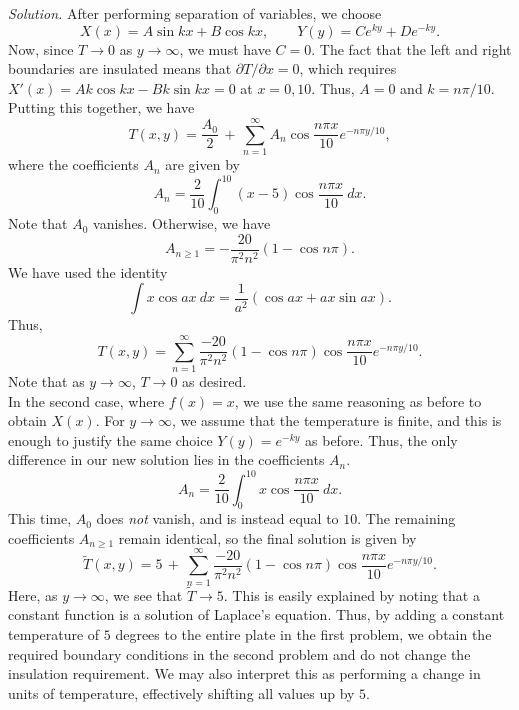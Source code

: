 \documentclass[10pt]{article}
\begin{document}
        \textit{Solution.} After performing separation of variables, we choose
        \[
                X(x) = A\sin{k x} + B\cos{k x}, \quad\quad Y(y) = Ce^{k y} + De^{-k y}.
        \]
        Now, since $T \to 0$ as $y \to \infty$, we must have $C = 0$. The fact that the left and right boundaries are insulated means that
        $\partial T /\partial x = 0$, which requires $X'(x) = Ak\cos{kx} - Bk\sin{kx} = 0$ at $x = 0, 10$. Thus, $A = 0$ and $k = n \pi /10$.
        Putting this together, we have
        \[
                T(x, y) = \frac{A_0}{2} \,+\, \sum_{n = 1}^\infty A_n \cos\frac{n \pi x}{10}e^{-n\pi y /10},
        \]
        where the coefficients $A_n$ are given by
        \[
                A_n = \frac{2}{10} \int_0^{10} (x - 5) \cos\frac{n\pi x}{10}\: dx.
        \]
        Note that $A_0$ vanishes. Otherwise, we have
        \[
                A_{n \geq 1} = -\frac{20}{\pi^2 n^2}(1 - \cos{n\pi}).
        \]
        We have used the identity
        \[
                \int x\cos{ax}\: dx = \frac{1}{a^2}(\cos{ax} + ax \sin{ax}).
        \]
        Thus,
        \[
                T(x, y) = \sum_{n = 1}^\infty \frac{-20}{\pi^2n^2}(1 - \cos{n\pi}) \cos\frac{n\pi x}{10} e^{-n\pi y /10}.
        \]
        Note that as $y \to \infty$, $T \to 0$ as desired. \\

        In the second case, where $f(x) = x$, we use the same reasoning as before to obtain $X(x)$. For $y \to \infty$, we assume that
        the temperature is finite, and this is enough to justify the same choice $Y(y) = e^{-ky}$ as before. Thus, the only difference
        in our new solution lies in the coefficients $A_n$.
        \[
                A_n = \frac{2}{10} \int_0^{10} x \cos\frac{n\pi x}{10}\: dx.
        \]
        This time, $A_0$ does \textit{not} vanish, and is instead equal to $10$. The remaining coefficients $A_{n \geq 1}$ remain identical,
        so the final solution is given by
        \[
                \tilde{T}(x, y) = 5 \,+\, \sum_{n = 1}^\infty \frac{-20}{\pi^2n^2}(1 - \cos{n\pi}) \cos\frac{n\pi x}{10} e^{-n\pi y /10}.
        \]
        Here, as $y \to \infty$, we see that $\tilde{T} \to 5$. This is easily explained by noting that a constant function is a solution of
        Laplace's equation. Thus, by adding a constant temperature of $5$ degrees to the entire plate in the first problem, we obtain the required
        boundary conditions in the second problem and do not change the insulation requirement. We may also interpret this as performing a
        change in units of temperature, effectively shifting all values up by $5$.
\end{document}

